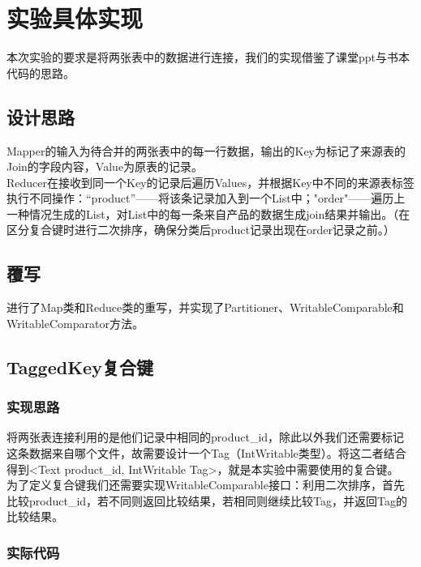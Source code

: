 \documentclass{article}
\begin{document}
\section{实验具体实现}
本次实验的要求是将两张表中的数据进行连接，我们的实现借鉴了课堂ppt与书本代码的思路。

\subsection{设计思路}
Mapper的输入为待合并的两张表中的每一行数据，输出的Key为标记了来源表的Join的字段内容，Value为原表的记录。\\
Reducer在接收到同一个Key的记录后遍历Values，并根据Key中不同的来源表标签执行不同操作：“product”——将该条记录加入到一个List中；"order"——遍历上一种情况生成的List，对List中的每一条来自产品的数据生成join结果并输出。（在区分复合键时进行二次排序，确保分类后product记录出现在order记录之前。）

\subsection{覆写}
进行了Map类和Reduce类的重写，并实现了Partitioner、WritableComparable和WritableComparator方法。

\subsection{TaggedKey复合键}

\subsubsection{实现思路}
将两张表连接利用的是他们记录中相同的product\_id，除此以外我们还需要标记这条数据来自哪个文件，故需要设计一个Tag（IntWritable类型）。将这二者结合得到<Text product\_id, IntWritable Tag>，就是本实验中需要使用的复合键。\\
为了定义复合键我们还需要实现WritableComparable接口：利用二次排序，首先比较product\_id，若不同则返回比较结果，若相同则继续比较Tag，并返回Tag的比较结果。
\subsubsection{实际代码}
\end{document}
